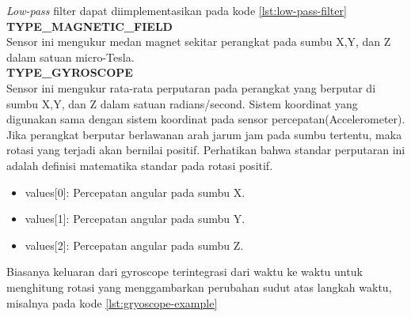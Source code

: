 \textit{Low-pass} filter dapat diimplementasikan pada kode \ref{lst:low-pass-filter}\\
\textbf{TYPE\_MAGNETIC\_FIELD}\\
Sensor ini mengukur medan magnet sekitar perangkat pada sumbu X,Y, dan Z dalam satuan micro-Tesla.\\
\textbf{TYPE\_GYROSCOPE}\\
Sensor ini mengukur rata-rata perputaran pada perangkat yang berputar di sumbu X,Y, dan Z dalam satuan radians/second. Sistem koordinat yang digunakan sama dengan sistem koordinat pada sensor percepatan(Accelerometer). Jika perangkat berputar berlawanan arah jarum jam pada sumbu tertentu, maka rotasi yang terjadi akan bernilai positif. Perhatikan bahwa standar perputaran ini adalah definisi matematika standar pada rotasi positif.
\begin{itemize}
	\item values[0]: Percepatan angular pada sumbu X.
	\item values[1]: Percepatan angular pada sumbu Y.
	\item values[2]: Percepatan angular pada sumbu Z.
\end{itemize}
Biasanya keluaran dari gyroscope terintegrasi dari waktu ke waktu untuk menghitung rotasi yang menggambarkan perubahan sudut atas langkah waktu, misalnya pada kode \ref{lst:gryoscope-example}
